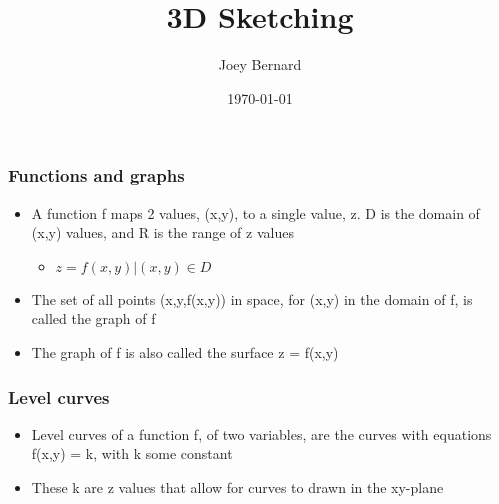 \documentclass{beamer}
\title{3D Sketching}
\author{Joey Bernard}
\institute{University of New Brunswick}
\date{\today}
\begin{document}
\begin{frame}
  \titlepage
\end{frame}

\begin{frame}
  \frametitle{Functions and graphs}
  \begin{itemize}
  \item A function f maps 2 values, (x,y), to a single value, z. D is the domain of (x,y) values, and R is the range of z values
    \begin{itemize}
    \item ${z = f(x,y) | (x,y) \in D}$
    \end{itemize}
  \item The set of all points (x,y,f(x,y)) in space, for (x,y) in the domain of f, is called the graph of f
  \item The graph of f is also called the surface z = f(x,y)
  \end{itemize}
\end{frame}

\begin{frame}
  \frametitle{Level curves}
  \begin{itemize}
  \item Level curves of a function f, of two variables, are the curves with equations f(x,y) = k, with k some constant
  \item These k are z values that allow for curves to drawn in the xy-plane
  \end{itemize}
\end{frame}
\end{document}
